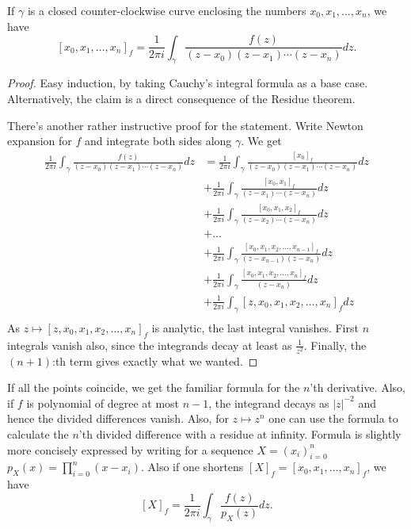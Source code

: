 \begin{lem}\label{div_cauchy}
If $\gamma$ is a closed counter-clockwise curve enclosing the numbers $x_{0}, x_{1}, \ldots, x_{n}$, we have
\[
	[x_{0}, x_{1}, \ldots, x_{n}]_{f} = \frac{1}{2 \pi i} \int_{\gamma} \frac{f(z)}{(z - x_{0})(z - x_{1}) \cdots (z - x_{n})} dz.
\]
\end{lem}
\begin{proof}
Easy induction, by taking Cauchy's integral formula as a base case. Alternatively, the claim is a direct consequence of the Residue theorem.

There's another rather instructive proof for the statement. Write Newton expansion for $f$ and integrate both sides along $\gamma$. We get
\begin{align*}
	\frac{1}{2 \pi i} \int_{\gamma} \frac{f(z)}{(z - x_{0})(z - x_{1}) \cdots (z - x_{n})} dz &= \frac{1}{2 \pi i} \int_{\gamma} \frac{[x_{0}]_{f}}{(z - x_{0})(z - x_{1}) \cdots (z - x_{n})} dz \\
	&+ \frac{1}{2 \pi i} \int_{\gamma} \frac{[x_{0}, x_{1}]_{f}}{(z - x_{1}) \cdots (z - x_{n})} dz \\
	&+ \frac{1}{2 \pi i} \int_{\gamma} \frac{[x_{0}, x_{1}, x_{2}]_{f}}{(z - x_{2}) \cdots (z - x_{n})} dz \\
	&+ \ldots \\
	&+ \frac{1}{2 \pi i} \int_{\gamma} \frac{[x_{0}, x_{1}, x_{2}, \ldots, x_{n - 1}]_{f}}{(z - x_{n - 1})(z - x_{n})} dz \\
	&+ \frac{1}{2 \pi i} \int_{\gamma} \frac{[x_{0}, x_{1}, x_{2}, \ldots, x_{n}]_{f}}{(z - x_{n})} dz \\
	&+ \frac{1}{2 \pi i} \int_{\gamma} [z, x_{0}, x_{1}, x_{2}, \ldots, x_{n}]_{f} dz \\
\end{align*}
As $z \mapsto [z, x_{0}, x_{1}, x_{2}, \ldots, x_{n}]_{f}$ is analytic, the last integral vanishes. First $n$ integrals vanish also, since the integrands decay at least as $\frac{1}{z^2}$. Finally, the $(n + 1)$:th term gives exactly what we wanted.
\end{proof}

If all the points coincide, we get the familiar formula for the $n$'th derivative. Also, if $f$ is polynomial of degree at most $n - 1$, the integrand decays as $|z|^{-2}$ and hence the divided differences vanish. Also, for $z \mapsto z^{n}$ one can use the formula to calculate the $n$'th divided difference with a residue at infinity. Formula is slightly more concisely expressed by writing for a sequence $X = (x_{i})_{i = 0}^{n}$ $p_{X}(x) = \prod_{i = 0}^{n} (x - x_{i})$. Also if one shortens $[X]_{f} = [x_{0}, x_{1}, \ldots, x_{n}]_{f}$, we have
\[
	[X]_{f} = \frac{1}{2 \pi i} \int_{\gamma} \frac{f(z)}{p_{X}(z)} dz.
\]

